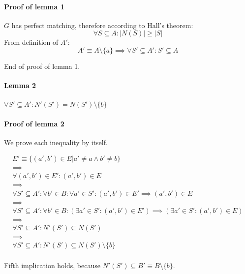 \paragraph{Proof of lemma 1}
$G$ has perfect matching, therefore according to Hall's theorem:
\[
    \forall S \subseteq A: \left| N(S) \right| \geq \left| S \right|
\]
From definition of $A'$:
\[
    A' \equiv A \setminus \{a\} \implies \forall S' \subseteq A': S' \subseteq A
\]

End of proof of lemma 1.

\paragraph{Lemma 2}
$\forall S' \subseteq A': N'(S') = N(S') \setminus \{b\}$

\paragraph{Proof of lemma 2}

We prove each inequality by itself.

\begin{gather*}
    E' \equiv \{(a', b') \in E | a' \neq a \land b' \neq b\} \\
    \implies \\
    \forall (a', b') \in E': (a', b') \in E \\
    \implies \\
    \forall S' \subseteq A': \forall b' \in B: \forall a' \in S': (a', b') \in E' \implies (a', b') \in E \\
    \implies \\
    \forall S' \subseteq A': \forall b' \in B: (\exists a' \in S': (a', b') \in E') \implies (\exists a' \in S': (a', b') \in E) \\
    \implies \\
    \forall S' \subseteq A': N'(S') \subseteq N(S') \\
    \implies \\
    \forall S' \subseteq A': N'(S') \subseteq N(S') \setminus \{b\} \\
\end{gather*}

Fifth implication holds, because $N'(S') \subseteq B' \equiv B \setminus \{b\}$.

